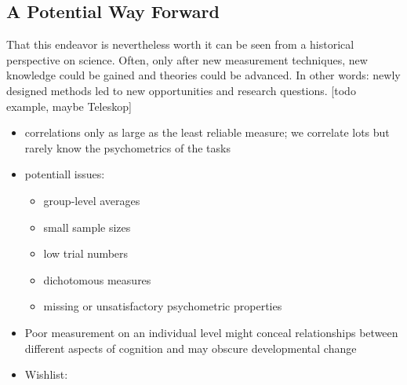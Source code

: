 \documentclass[
]{scrbook}
\providecommand{\tightlist}{%
  \setlength{\itemsep}{0pt}\setlength{\parskip}{0pt}}
\begin{document}
\subsection{A Potential Way Forward}\label{a-potential-way-forward}

That this endeavor is nevertheless worth it can be seen from a historical perspective on science. Often, only after new measurement techniques, new knowledge could be gained and theories could be advanced. In other words: newly designed methods led to new opportunities and research questions. {[}todo example, maybe Teleskop{]}

\begin{itemize}
\item
  correlations only as large as the least reliable measure; we correlate lots but rarely know the psychometrics of the tasks
\item
  potentiall issues:

  \begin{itemize}
  \tightlist
  \item
    group-level averages
  \item
    small sample sizes
  \item
    low trial numbers
  \item
    dichotomous measures
  \item
    missing or unsatisfactory psychometric properties
  \end{itemize}
\item
  Poor measurement on an individual level might conceal relationships between different aspects of cognition and may obscure developmental change
\item
  Wishlist:


\end{itemize}
\end{document}
